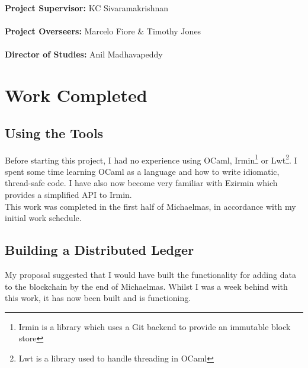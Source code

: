 \documentclass[12pt]{article}
\begin{document}
\maketitle

\noindent \textbf{Project Supervisor:} KC Sivaramakrishnan \\
\\
\textbf{Project Overseers:} Marcelo Fiore \& Timothy Jones\\
\\
\textbf{Director of Studies:} Anil Madhavapeddy\\

\section{Work Completed}
\subsection*{Using the Tools}
Before starting this project, I had no experience using OCaml, Irmin\footnote{Irmin is a library which uses a Git backend to provide an immutable block store} or Lwt\footnote{Lwt is a library used to handle threading in OCaml}.
I spent some time learning OCaml as a language and how to write idiomatic, thread-safe code. 
I have also now become very familiar with Ezirmin which provides a simplified API to Irmin. \\
This work was completed in the first half of Michaelmas, in accordance with my initial work schedule.
\subsection*{Building a Distributed Ledger}
My proposal suggested that I would have built the functionality for adding data to the blockchain by the end of Michaelmas. 
Whilst I was a week behind with this work, it has now been built and is functioning.
\end{document}
